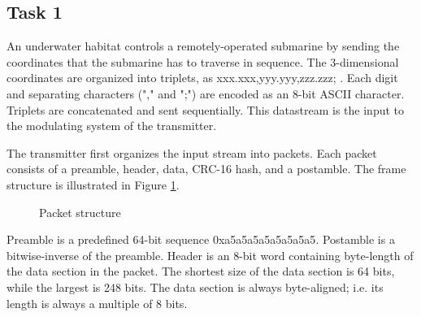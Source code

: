 \documentclass{article}
\begin{document}
	\subsection{Task 1}
An underwater habitat controls a remotely-operated submarine by sending the coordinates that the submarine has to traverse in sequence. The 3-dimensional coordinates are organized into triplets, as \textsf{xxx.xxx,yyy.yyy,zzz.zzz;} . Each digit and separating characters ("\textsf{,}" and "\textsf{;}") are encoded as an 8-bit ASCII character. Triplets are concatenated and sent sequentially. This datastream is the input to the modulating system of the transmitter.

The transmitter first organizes the input stream into packets. Each packet consists of a preamble, header, data, CRC-16 hash, and a postamble. The frame structure is illustrated in Figure \ref{fig:packet}.

\begin{figure}[h!]
\centering
{}
\caption{Packet structure}
\label{fig:packet}
\end{figure}

Preamble is a predefined 64-bit sequence \textsf{0xa5a5a5a5a5a5a5a5}. Postamble is a bitwise-inverse of the preamble. Header is an 8-bit word containing byte-length of the data section in the packet. The shortest size of the data section is 64 bits, while the largest is 248 bits. The data section is always byte-aligned; i.e. its length is always a multiple of 8 bits.
\end{document}
